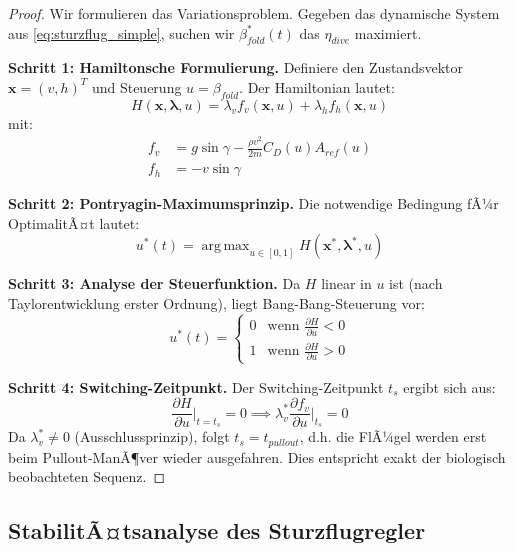 ﻿\documentclass[12pt,a4paper]{article}
\theoremstyle{remark}
\DeclareMathOperator*{\argmax}{arg\,max}
\begin{document}
	\begin{proof}
		Wir formulieren das Variationsproblem. Gegeben das dynamische System aus \cref{eq:sturzflug_simple}, suchen wir $\beta^*_{fold}(t)$ das $\eta_{dive}$ maximiert.
		
		\textbf{Schritt 1: Hamiltonsche Formulierung.}
		Definiere den Zustandsvektor $\mathbf{x} = (v, h)^T$ und Steuerung $u = \beta_{fold}$. Der Hamiltonian lautet:
		\begin{equation}
			H(\mathbf{x}, \boldsymbol{\lambda}, u) = \lambda_v f_v(\mathbf{x}, u) + \lambda_h f_h(\mathbf{x}, u)
		\end{equation}
		mit:
		\begin{align}
			f_v &= g\sin\gamma - \frac{\rho v^2}{2m} C_D(u) A_{ref}(u) \\
			f_h &= -v\sin\gamma
		\end{align}
		
		\textbf{Schritt 2: Pontryagin-Maximumsprinzip.}
		Die notwendige Bedingung fÃ¼r OptimalitÃ¤t lautet:
		\begin{equation}
			u^*(t) = \argmax_{u \in [0,1]} H(\mathbf{x}^*, \boldsymbol{\lambda}^*, u)
			\label{eq:pmp}
		\end{equation}
		
		\textbf{Schritt 3: Analyse der Steuerfunktion.}
		Da $H$ linear in $u$ ist (nach Taylorentwicklung erster Ordnung), liegt Bang-Bang-Steuerung vor:
		\begin{equation}
			u^*(t) = \begin{cases} 0 & \text{wenn } \frac{\partial H}{\partial u} < 0 \\ 1 & \text{wenn } \frac{\partial H}{\partial u} > 0 \end{cases}
		\end{equation}
		
		\textbf{Schritt 4: Switching-Zeitpunkt.}
		Der Switching-Zeitpunkt $t_s$ ergibt sich aus:
		\begin{equation}
			\frac{\partial H}{\partial u}\bigg|_{t=t_s} = 0 \implies \lambda_v^* \frac{\partial f_v}{\partial u}\bigg|_{t_s} = 0
		\end{equation}
		Da $\lambda_v^* \neq 0$ (Ausschlussprinzip), folgt $t_s = t_{pullout}$, d.h. die FlÃ¼gel werden erst beim Pullout-ManÃ¶ver wieder ausgefahren. Dies entspricht exakt der biologisch beobachteten Sequenz.
	\end{proof}
	
	\subsection{StabilitÃ¤tsanalyse des Sturzflugregler}
	
\end{document}
